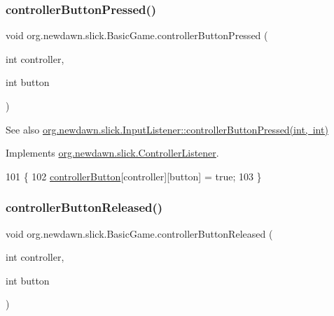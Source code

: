 \subsubsection{\texorpdfstring{controller\+Button\+Pressed()}{controllerButtonPressed()}}
{\footnotesize\ttfamily void org.\+newdawn.\+slick.\+Basic\+Game.\+controller\+Button\+Pressed (\begin{DoxyParamCaption}\item[{int}]{controller,  }\item[{int}]{button }\end{DoxyParamCaption})\hspace{0.3cm}{\ttfamily [inline]}}

\begin{DoxySeeAlso}{See also}
\mbox{\hyperlink{interfaceorg_1_1newdawn_1_1slick_1_1_controller_listener_ae6feac165a8d0eded01f38de12f239ff}{org.\+newdawn.\+slick.\+Input\+Listener\+::controller\+Button\+Pressed(int, int)}} 
\end{DoxySeeAlso}


Implements \mbox{\hyperlink{interfaceorg_1_1newdawn_1_1slick_1_1_controller_listener_ae6feac165a8d0eded01f38de12f239ff}{org.\+newdawn.\+slick.\+Controller\+Listener}}.


\begin{DoxyCode}
101                                                                     \{
102         \mbox{\hyperlink{classorg_1_1newdawn_1_1slick_1_1_basic_game_a77093ea9bb39adc83d2c1a0212efdf01}{controllerButton}}[controller][button] = \textcolor{keyword}{true};
103     \}
\end{DoxyCode}
\mbox{\label{classorg_1_1newdawn_1_1slick_1_1_basic_game_ad979755eccbdc2959289f001b2c26bda}} 
\subsubsection{\texorpdfstring{controller\+Button\+Released()}{controllerButtonReleased()}}
{\footnotesize\ttfamily void org.\+newdawn.\+slick.\+Basic\+Game.\+controller\+Button\+Released (\begin{DoxyParamCaption}\item[{int}]{controller,  }\item[{int}]{button }\end{DoxyParamCaption})\hspace{0.3cm}{\ttfamily [inline]}}

